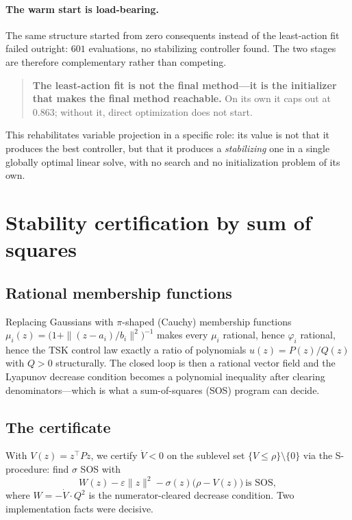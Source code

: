 \documentclass[11pt]{article}
\theoremstyle{plain}
\theoremstyle{definition}
\newcommand{\Vdot}{\dot{V}}
\begin{document}
\paragraph{The warm start is load-bearing.} The same structure started from zero
consequents instead of the least-action fit failed outright: $601$ evaluations,
no stabilizing controller found. The two stages are therefore complementary
rather than competing.

\begin{quote}
\textbf{The least-action fit is not the final method---it is the initializer
that makes the final method reachable.} On its own it caps out at $0.863$;
without it, direct optimization does not start.
\end{quote}

This rehabilitates variable projection in a specific role: its value is not that
it produces the best controller, but that it produces a \emph{stabilizing} one
in a single globally optimal linear solve, with no search and no initialization
problem of its own.

\section{Stability certification by sum of squares}
\label{sec:sos}

\subsection{Rational membership functions}

Replacing Gaussians with $\pi$-shaped (Cauchy) membership functions
$\mu_i(z)=\big(1+\|(z-a_i)/b_i\|^{2}\big)^{-1}$ makes every $\mu_i$ rational,
hence $\varphi_i$ rational, hence the TSK control law exactly a ratio of
polynomials $u(z)=P(z)/Q(z)$ with $Q>0$ structurally. The closed loop is then a
rational vector field and the Lyapunov decrease condition becomes a polynomial
inequality after clearing denominators---which is what a sum-of-squares (SOS)
program can decide.

\subsection{The certificate}

With $V(z)=z^{\top}Pz$, we certify $\Vdot<0$ on the sublevel set
$\{V\le\rho\}\setminus\{0\}$ via the S-procedure: find $\sigma$ SOS with
\begin{equation}
W(z)-\varepsilon\|z\|^{2}-\sigma(z)\big(\rho-V(z)\big)\ \text{is SOS},
\label{eq:sproc}
\end{equation}
where $W=-\Vdot\cdot Q^{2}$ is the numerator-cleared decrease condition. Two
implementation facts were decisive.
\end{document}
